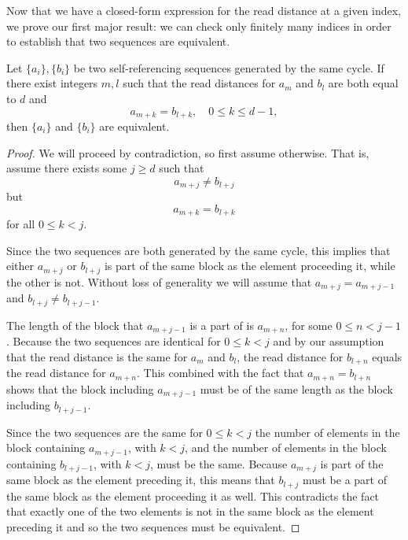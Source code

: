 \documentclass[runningheads,a4paper]{llncs}
\begin{document}
Now that we have a closed-form expression for the read distance at a given index, we prove our first major result: we can check only finitely many indices in order to establish that two sequences are equivalent.
\begin{theorem} 
\label{equivsuff}
Let $\{a_i\}, \{b_i\}$ be two self-referencing sequences generated by the same cycle. If there exist integers $m,l$ such that the read distances for $a_m$ and $b_l$ are both equal to $d$ and 
\begin{equation*}
a_{m+k} = b_{l+k}, \quad 0 \leq k \leq d-1,
\end{equation*}
then $\{a_i\}$ and $\{b_i\}$ are equivalent. 
\end{theorem}

\begin{proof}
We will proceed by contradiction, so first assume otherwise. That is, assume there exists some $j \geq d$ such that 
\begin{equation*}
a_{m+j} \neq b_{l+j}
\end{equation*}
but 
\begin{equation*}
a_{m+k} = b_{l+k}
\end{equation*} 
for all $0 \leq k < j$. 

Since the two sequences are both generated by the same cycle, this implies that either $a_{m+j}$ or $b_{l+j}$ is part of the same block as the element proceeding it, while the other is not.
Without loss of generality we will assume that $a_{m+j}=a_{m+j-1}$ and $b_{l+j} \neq b_{l+j-1}$. 

The length of the block that $a_{m+j-1}$ is a part of is $a_{m+n}$, for some $0 \leq n < j-1$. Because the two sequences are identical for $0 \leq k<j$ and by our assumption that the read distance is the same for $a_{m}$ and $b_{l}$, the read distance for $b_{l+n}$ equals the read distance for $a_{m+n}$. This combined with the fact that $a_{m+n} = b_{l+n}$ shows that the block including $a_{m+j-1}$ must be of the same length as the block including $b_{l+j-1}$. 

Since the two sequences are the same for $0 \leq k<j$ the number of elements in the block containing $a_{m+j-1}$, with $k<j$, and the number of elements in the block containing $b_{l+j-1}$, with $k<j$, must be the same. 
Because $a_{m+j}$ is part of the same block as the element preceding it, this means that $b_{l+j}$ must be a part of the same block as the element proceeding it as well. 
This contradicts the fact that exactly one of the two elements is not in the same block as the element preceding it and so the two sequences must be equivalent. 


\end{proof}
\end{document}
